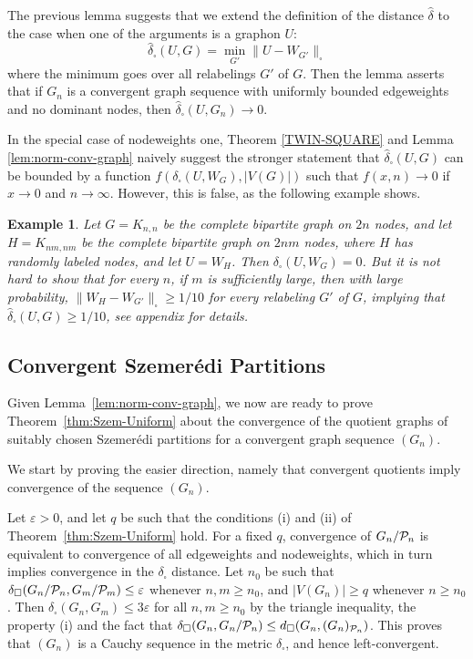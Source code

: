 \documentclass[12pt]{article}
\newtheorem{example}{Example}[section]
\numberwithin{equation}{section}
\def\eps{\varepsilon}
\def\PP{{\cal P}}\def\QQ{{\cal Q}}\def\RR{{\cal R}}
\begin{document}
The previous lemma suggests that we extend the definition of the distance
$\hat\delta$ to the case when one of the arguments is a graphon $U$:
\begin{equation}
\label{hatdelta-U-G}
\hat\delta_\square(U,G)=\min_{G'}\|U-W_{G'}\|_\square
\end{equation}
where the minimum goes over all relabelings $G'$ of $G$. Then the
lemma asserts that if $G_n$ is a convergent graph sequence with
uniformly bounded edgeweights {and no dominant nodes}, then
$\hat\delta_\square(U,G_n)\to 0$.

{In the special case of nodeweights one}, Theorem \ref{TWIN-SQUARE}
and Lemma \ref{lem:norm-conv-graph} {naively} suggest the stronger
statement that $\hat\delta_\square(U, G)$ can be bounded by a
function $f(\delta_\square(U,W_G),|V(G)|)$ such that $f(x,n)\to 0$ if
$x\to 0$ and $n\to\infty$. However, this is false, as the following
example shows.

\begin{example}\label{ex:norm-metric}
Let $G=K_{n,n}$ be the complete bipartite graph on $2n$ nodes, and
let $H=K_{nm,nm}$ be the complete bipartite graph on $2nm$ nodes,
where $H$ has randomly labeled nodes, and let $U=W_H$. Then
$\delta_\square(U,W_G)=0$. But it is not hard to show that for every
$n$, if $m$ is sufficiently large, then with large probability,
$\|W_H-W_{G'}\|_\square \ge 1/10$ for every relabeling $G'$ of $G$,
implying that $\hat\delta_\square(U,G)\geq 1/10$,
see appendix for details.
\end{example}

\subsection{Convergent Szemer\'edi Partitions}
\label{sec:ConvSzemPart}

Given Lemma~\ref{lem:norm-conv-graph}, we now are ready to
prove Theorem~\ref{thm:Szem-Uniform} about the convergence of
the quotient graphs of suitably chosen Szemer\'edi partitions
for a convergent graph sequence $(G_n)$.

We start by proving the easier direction, namely that
convergent quotients imply convergence of the sequence
$(G_n)$.

Let $\eps>0$, and let $q$ be such that the conditions
(i) and (ii) of Theorem~\ref{thm:Szem-Uniform} hold.  For
a fixed $q$, convergence of $G_n/\PP_n$ is equivalent to convergence
of all edgeweights and nodeweights, which in turn implies convergence in
the $\delta_\square$ distance.  Let $n_0$ be such that
$\delta_\square(G_n/\PP_n,G_m/\PP_m)\leq \eps$ whenever $n,m\geq n_0$,
and $|V(G_n)|\geq q$ whenever $n\geq n_0$.
Then $\delta_\square(G_n,G_m)\leq 3\eps$ for all $n,m\geq n_0$
by the triangle inequality, the property (i) and the fact that
$\delta_\square(G_n,G_n/\PP_n)\leq d_\square(G_n,(G_n)_{\PP_n})$.
This proves that $(G_n)$ is a Cauchy sequence in the metric
$\delta_\square$, and hence left-convergent.
\end{document}
